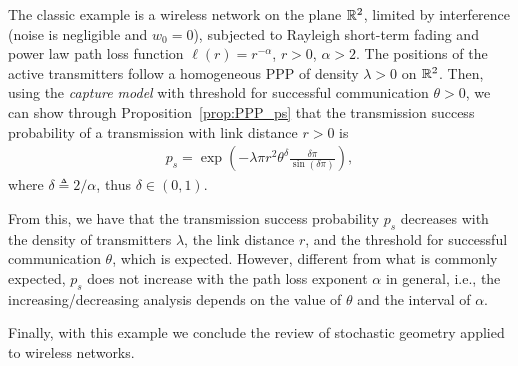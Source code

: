 \begin{example} \label{ex:classic_network}
    The classic example is a wireless network on the plane ${\mathbb R}^2$, limited by interference (noise is negligible and $w_0 = 0$), subjected to Rayleigh short-term fading and power law path loss function $\ell(r) = r^{-\alpha}$, $r>0$, $\alpha > 2$.
    The positions of the active transmitters follow a homogeneous PPP of density $\lambda > 0$ on ${\mathbb R}^2$.
    Then, using the \textit{capture model} with threshold for successful communication $\theta > 0$, we can show through Proposition~\ref{prop:PPP_ps} that the transmission success probability of a transmission with link distance $r>0$ is
    \begin{align*}
        p_s = \exp\!\left( -\lambda \pi r^2 \theta^\delta \frac{\delta\pi}{\sin(\delta\pi)} \right),
    \end{align*}
    where $\delta\triangleq 2/\alpha$, thus $\delta\in(0,1)$.
    
    From this, we have that the transmission success probability $p_s$ decreases with the density of transmitters $\lambda$, the link distance $r$, and the threshold for successful communication $\theta$, which is expected.
    However, different from what is commonly expected, $p_s$ does not increase with the path loss exponent $\alpha$ in general, i.e., the increasing/decreasing analysis depends on the value of $\theta$ and the interval of $\alpha$.
\end{example}

Finally, with this example we conclude the review of stochastic geometry applied to wireless networks.
